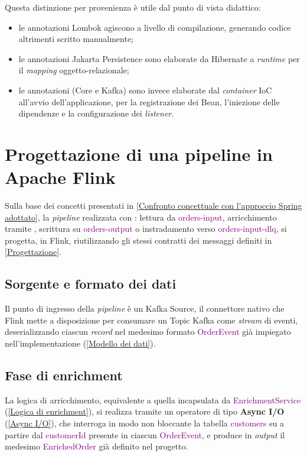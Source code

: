 \noindent
\newpage
\noindent
Questa distinzione per provenienza è utile dal punto di vista didattico: 
\begin{itemize}
    \item le annotazioni \gls{Lombok} agiscono a livello di compilazione, generando codice altrimenti scritto manualmente;
    \item le annotazioni \gls{Jakarta Persistence} sono elaborate da \gls{Hibernate} a \textit{runtime} per il \textit{mapping} oggetto-relazionale;
    \item le annotazioni  (Core e Kafka) sono invece elaborate dal \textit{container} \acrshort{IoC} all'avvio dell'applicazione, per la registrazione dei \gls{Bean}, l'iniezione delle dipendenze e la configurazione dei \textit{listener}.
\end{itemize}

\section{Progettazione di una pipeline in Apache Flink}
\label{Progettazione di una pipeline in Apache Flink}
Sulla base dei concetti presentati in \ref{Confronto concettuale con l'approccio Spring adottato}, la \textit{pipeline} realizzata con : lettura da \textcolor{purple}{orders-input}, arricchimento tramite , scrittura su \textcolor{purple}{orders-output} o instradamento verso \textcolor{purple}{orders-input-dlq}, si progetta, in Flink, riutilizzando gli stessi contratti dei messaggi definiti in \ref{Progettazione}.

\subsection{Sorgente e formato dei dati}
\label{Sorgente e formato dei dati}
Il punto di ingresso della \textit{pipeline} è un \gls{Kafka Source}, il connettore nativo che Flink mette a disposizione per consumare un \gls{Topic Kafka} come \textit{stream} di eventi, deserializzando ciascun \textit{record} nel medesimo formato \textcolor{purple}{OrderEvent} già impiegato nell'implementazione  (\ref{Modello dei dati}).

\subsection{Fase di enrichment}
La logica di arricchimento, equivalente a quella incapsulata da \textcolor{purple}{EnrichmentService} (\ref{Logica di enrichment}), si realizza tramite un operatore di tipo \textbf{Async I/O} (\ref{Async I/O}), che interroga in modo non bloccante la tabella \textcolor{purple}{customers} su  a partire dal \textcolor{purple}{customerId} presente in ciascun \textcolor{purple}{OrderEvent}, e produce in \textit{output} il medesimo \textcolor{purple}{EnrichedOrder} già definito nel progetto.

